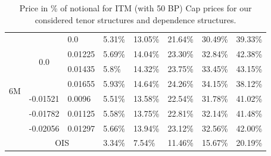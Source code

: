 \documentclass[12pt]{article}
\begin{document}
\begin{table}[H]
\begin{tabular}{|c||c||c||c|c|c|c|c|}
    \multirow{8}{*}{6M}& \multirow{4}{*}{0.0} & \multicolumn{1}{l||}{0.0}               & \multicolumn{1}{l|}{5.31\%}    & \multicolumn{1}{l|}{13.05\%}   & \multicolumn{1}{l|}{21.64\%} & \multicolumn{1}{l|}{30.49\%} & \multicolumn{1}{l|}{39.33\%}\\\cline{3-8}
                        &                          & \multicolumn{1}{l||}{0.01225}      & \multicolumn{1}{l|}{5.69\%} & \multicolumn{1}{l|}{14.04\%}      & \multicolumn{1}{l|}{23.30\%} & \multicolumn{1}{l|}{32.84\%} & \multicolumn{1}{l|}{42.38\%}\\\cline{3-8}
                        &                          & \multicolumn{1}{l||}{0.01435}      & \multicolumn{1}{l|}{5.8\%} &  \multicolumn{1}{l|}{14.32\%}     & \multicolumn{1}{l|}{23.75\%} & \multicolumn{1}{l|}{33.45\%} & \multicolumn{1}{l|}{43.15\%}\\\cline{3-8}
                        &                          & \multicolumn{1}{l||}{0.01655}      & \multicolumn{1}{l|}{5.93\%} &   \multicolumn{1}{l|}{14.64\%}    & \multicolumn{1}{l|}{24.26\%} & \multicolumn{1}{l|}{34.15\%} & \multicolumn{1}{l|}{38.12\%}\\\cline{2-8}
                        & \multicolumn{1}{l||}{-0.01521} & \multicolumn{1}{l||}{0.0096} & \multicolumn{1}{l|}{5.51\%} & \multicolumn{1}{l|}{13.58\%}      & \multicolumn{1}{l|}{22.54\%} & \multicolumn{1}{l|}{31.78\%} & \multicolumn{1}{l|}{41.02\%}\\\cline{2-8}
                        & \multicolumn{1}{l||}{-0.01782} & \multicolumn{1}{l||}{0.01125} & \multicolumn{1}{l|}{5.58\%} & \multicolumn{1}{l|}{13.75\%}     & \multicolumn{1}{l|}{22.81\%} & \multicolumn{1}{l|}{32.14\%} & \multicolumn{1}{l|}{41.48\%}\\\cline{2-8}
                        & \multicolumn{1}{l||}{-0.02056} & \multicolumn{1}{l||}{0.01297} & \multicolumn{1}{l|}{5.66\%} & \multicolumn{1}{l|}{13.94\%}     & \multicolumn{1}{l|}{23.12\%} & \multicolumn{1}{l|}{32.56\%} & \multicolumn{1}{l|}{42.00\%}\\\cline{2-8}
                        &  \multicolumn{2}{|c||}{OIS}                                   &  \multicolumn{1}{l|}{3.34\%} & \multicolumn{1}{l|}{7.54\%}      & \multicolumn{1}{l|}{11.46\%} & \multicolumn{1}{l|}{15.67\%} & \multicolumn{1}{l|}{20.19\%}\\ \hline
     \end{tabular}
    \caption{Price in \% of notional for ITM (with 50 BP) Cap prices for our considered tenor structures
    and dependence structures.}
    \label{tab:ITMCapPrice}
\end{table}
\end{document}
